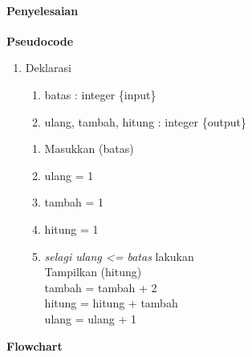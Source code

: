\documentclass[a4paper,12pt]{article}
\begin{document}
\paragraph{Penyelesaian\\}
{\bfseries Pseudocode\\}
\begin{enumerate}
	\item Deklarasi
	\begin{enumerate}[label=\arabic*.]
		\item batas : integer \{input\}
		\item ulang, tambah, hitung : integer \{output\}
	\end{enumerate}
	\begin{enumerate}[label=\arabic*.]
		\item Masukkan (batas)
		\item ulang = 1
		\item tambah = 1
		\item hitung = 1
		\item \textit{selagi ulang <= batas} lakukan\\
		 Tampilkan (hitung)\\
		 tambah = tambah + 2\\
		 hitung = hitung + tambah\\
		 ulang = ulang + 1	
	\end{enumerate}
\end{enumerate}
{\bfseries Flowchart\\}
\end{document}
